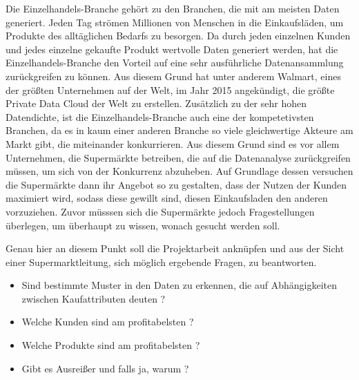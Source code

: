 \documentclass[usegeometry=true]{scrartcl}
\begin{document}
\noindent Die Einzelhandels-Branche gehört zu den Branchen, die mit am meisten Daten generiert.
Jeden Tag strömen Millionen von Menschen in die Einkaufsläden, um Produkte des alltäglichen Bedarfs zu besorgen.
Da durch jeden einzelnen Kunden und jedes einzelne gekaufte Produkt wertvolle Daten generiert werden, hat die Einzelhandels-Branche den Vorteil auf eine sehr ausführliche
Datenansammlung zurückgreifen zu können.
Aus diesem Grund hat unter anderem Walmart, eines der größten Unternehmen auf der Welt, im Jahr 2015 angekündigt, die größte Private Data Cloud der Welt
zu erstellen.\cite[5]{marr2016big}
Zusätzlich zu der sehr hohen Datendichte, ist die Einzelhandels-Branche auch eine der kompetetivsten Branchen, da es in kaum einer anderen Branche
so viele gleichwertige Akteure am Markt gibt, die miteinander konkurrieren.\cite{Grewal2010}
Aus diesem Grund sind es vor allem Unternehmen, die Supermärkte betreiben, die auf die Datenanalyse zurückgreifen müssen, um sich von der Konkurrenz abzuheben.
Auf Grundlage dessen versuchen die Supermärkte dann ihr Angebot so zu gestalten, dass der Nutzen der Kunden maximiert wird, sodass diese gewillt sind, diesen Einkaufsladen den anderen vorzuziehen.\cite[6]{marr2016big}
Zuvor müsssen sich die Supermärkte jedoch Fragestellungen überlegen, um überhaupt zu wissen, wonach gesucht werden soll.

\noindent Genau hier an diesem Punkt soll die Projektarbeit anknüpfen und aus der Sicht einer Supermarktleitung, sich möglich ergebende Fragen, zu beantworten.

\begin{itemize}
	\item Sind bestimmte Muster in den Daten zu erkennen, die auf Abhängigkeiten zwischen Kaufattributen deuten ?
	\item Welche Kunden sind am profitabelsten ?
	\item Welche Produkte sind am profitabelsten ?
	\item Gibt es Ausreißer und falls ja, warum ?
\end{itemize}
\end{document}
